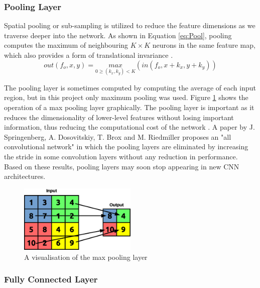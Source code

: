 \documentclass[12pt]{article}
\begin{document}
\subsubsection{Pooling Layer}
\label{sec:Background-CNN-Pool}


Spatial pooling or sub-sampling is utilized to reduce the feature dimensions as we traverse deeper into the network. As shown in Equation \ref{eq:Pool}, pooling computes the maximum of neighbouring $K\times K$ neurons in the same feature map, which also provides a form of translational invariance \cite{PoolAnalysis}. 
\begin{equation}
out(f_o,x,y)=\underset{0\geqslant (k_x,k_y)<K}{max}(in(f_o,x+k_x,y+k_y))
\label{eq:Pool}
\end{equation}

The pooling layer is sometimes computed by computing the average of each input region, but in this project only maximum pooling was used. Figure \ref{fig:pool} shows the operation of a max pooling layer graphically. The pooling layer is important as it reduces the dimensionality of lower-level features without losing important information, thus reducing the computational cost of the network \cite{SudaFpgaAccelerator}. A paper by J. Springenberg, A. Dosovitskiy, T. Brox and M. Riedmiller proposes an "all convolutional network" in which the pooling layers are eliminated by increasing the stride in some convolution layers without any reduction in performance\cite{AllConv}. Based on these results, pooling layers may soon stop appearing in new CNN architectures.

\begin{figure} [H]
\centering
\includegraphics[width=0.5\textwidth]{figures/pool.eps}
\caption{A visualisation of the max pooling layer}
\label{fig:pool}
\end{figure}

\subsubsection{Fully Connected Layer}
\label{sec:Background-CNN-FC}
\end{document}
